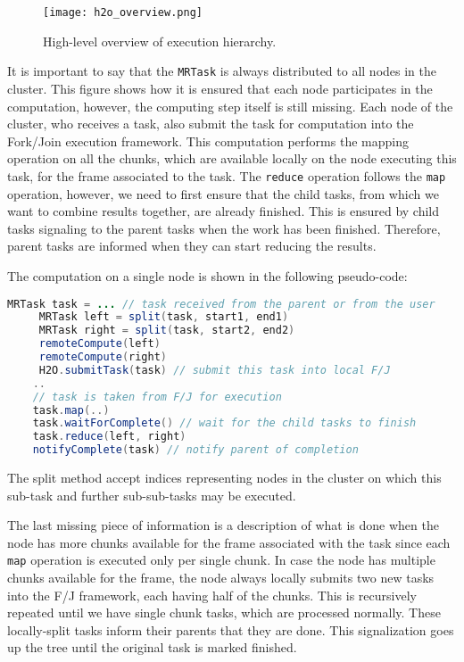 \begin{figure}
	\centering
	\texttt{[image: h2o\_overview.png]}
	\caption{High-level overview of execution hierarchy.}
	\label{fig:h2o_overview}
\end{figure}

It is important to say that the \texttt{MRTask} is always distributed to all nodes in the cluster. This figure shows how it is ensured that each node participates in the computation, however, the computing step itself is still missing. Each node of the cluster, who receives a task, also submit the task for computation into the Fork/Join execution framework. This computation performs the mapping operation on all the chunks, which are available locally on the node executing this task, for the frame associated to the task. The \texttt{reduce} operation follows the \texttt{map} operation, however, we need to first ensure that the child tasks, from which we want to combine results together, are already finished. This is ensured by child tasks signaling to the parent tasks when the work has been finished. Therefore, parent tasks are informed when they can start reducing the results. 

The computation on a single node is shown in the following pseudo-code:
\begin{lstlisting}[language=Java]
	 MRTask task = ... // task received from the parent or from the user
	 MRTask left = split(task, start1, end1)
	 MRTask right = split(task, start2, end2)
	 remoteCompute(left)
	 remoteCompute(right)
	 H2O.submitTask(task) // submit this task into local F/J
	..
	// task is taken from F/J for execution
	task.map(..)
	task.waitForComplete() // wait for the child tasks to finish
	task.reduce(left, right)
	notifyComplete(task) // notify parent of completion
\end{lstlisting}
The split method accept indices representing nodes in the cluster on which this sub-task and further sub-sub-tasks may be executed.

The last missing piece of information is a description of what is done when the node has more chunks available for the frame associated with the task since each \texttt{map} operation is executed only per single chunk. In case the node has multiple chunks available for the frame, the node always locally submits two new tasks into the F/J framework, each having half of the chunks. This is recursively repeated until we have single chunk tasks, which are processed normally. These locally-split tasks inform their parents that they are done. This signalization goes up the tree until the original task is marked finished.

